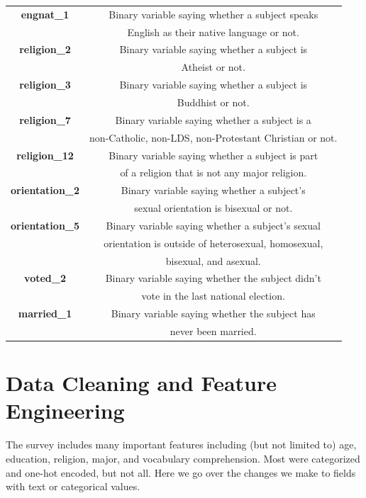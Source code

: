 \documentclass[11pt]{article}
\begin{document}
\begin{tabular}{ c|c }
        \hline
        \textbf{engnat\_1} & Binary variable saying whether a subject speaks \\ & English as their native language or not. \\
        \hline
        \textbf{religion\_2} & Binary variable saying whether a subject is \\ & Atheist or not. \\
        \hline
        \textbf{religion\_3} & Binary variable saying whether a subject is \\ & Buddhist or not. \\
        \hline
        \textbf{religion\_7} & Binary variable saying whether a subject is a \\ & non-Catholic, non-LDS, non-Protestant Christian or not. \\
        \hline
        \textbf{religion\_12} & Binary variable saying whether a subject is part \\ & of a religion that is not any major religion. \\
        \hline
        \textbf{orientation\_2} & Binary variable saying whether a subject's \\ & sexual orientation is bisexual or not. \\
        \hline
        \textbf{orientation\_5} & Binary variable saying whether a subject's sexual \\ & orientation is outside of heterosexual, homosexual, \\ & bisexual, and asexual. \\
        \hline
        \textbf{voted\_2} & Binary variable saying whether the subject didn't \\ & vote in the last national election. \\
        \hline
        \textbf{married\_1} & Binary variable saying whether the subject has \\ & never been married. \\
    \end{tabular}
\section*{Data Cleaning and Feature Engineering} The
survey includes many important features including (but not limited to)
age, education, religion, major, and vocabulary comprehension. Most were
categorized and one-hot encoded, but not all. Here we go over the
changes we make to fields with text or categorical values. 
\end{document}
